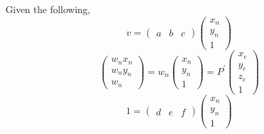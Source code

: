 \documentclass[11pt]{tingpset}
\begin{document}
  Given the following,
  \[
    v =
    \begin{pmatrix}
      a & b & c
    \end{pmatrix}
    \begin{pmatrix}
      x_n \\
      y_n \\
      1
    \end{pmatrix}
  \]
  \[
    \begin{pmatrix}
      w_n x_n \\
      w_n y_n \\
      w_n
    \end{pmatrix}
    =
    w_n
    \begin{pmatrix}
      x_n \\
      y_n \\
      1
    \end{pmatrix}
    =
    P^\prime
    \begin{pmatrix}
      x_e \\
      y_e \\
      z_e \\
      1
    \end{pmatrix}
  \]
  \[
    1 =
    \begin{pmatrix}
      d & e & f
    \end{pmatrix}
    \begin{pmatrix}
      x_n \\
      y_n \\
      1
    \end{pmatrix}
  \]
\end{document}
